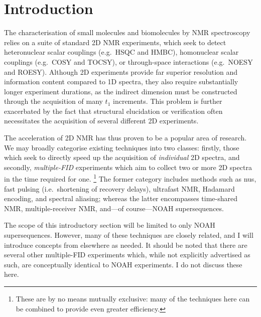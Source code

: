 \section{Introduction}
\label{sec:noah__introduction}

The characterisation of small molecules and biomolecules by NMR spectroscopy relies on a suite of standard 2D NMR experiments, which seek to detect heteronuclear scalar couplings (e.g.\ HSQC and HMBC), homonuclear scalar couplings (e.g.\ COSY and TOCSY), or through-space interactions (e.g.\ NOESY and ROESY).
Although 2D experiments provide far superior resolution and information content compared to 1D spectra, they also require substantially longer experiment durations, as the indirect dimension must be constructed through the acquisition of many $t_1$ increments.
This problem is further exacerbated by the fact that structural elucidation or verification often necessitates the acquisition of several different 2D experiments.

The acceleration of 2D NMR has thus proven to be a popular area of research.
We may broadly categorise existing techniques into two classes: firstly, those which seek to directly speed up the acquisition of \textit{individual} 2D spectra, and secondly, \textit{multiple-FID} experiments which aim to collect two or more 2D spectra in the time required for one.%
\footnote{These are by no means mutually exclusive: many of the techniques here can be combined to provide even greater efficiency.}
The former category includes methods such as 
\acf{nus}\autocite{Barna1987JMR,Kazimierczuk2010PNMRS,Mobli2014PNMRS,Kazimierczuk2015MRC},
fast pulsing (i.e.\ shortening of recovery delays)\autocite{SchulzeSunninghausen2014JACS,Schanda2006JACS,Kupce2007MRC,Schanda2009PNMRS},
ultrafast NMR\autocite{Frydman2002PNASUSA,Pelupessy2003JACS,Frydman2003JACS,Tal2010PNMRS,Gouilleux2018ARNMRS,Kupce2021NRMP},
Hadamard encoding\autocite{Kupce2003JMR,Kupce2003PNMRS},
and spectral aliasing\autocite{Jeannerat2000MRC,Bermel2009JACS,Njock2010C,Jeannerat2011eMR};
whereas the latter encompasses 
time-shared NMR\autocite{Nolis2007ACIE,Parella2010CMR},
multiple-receiver NMR\autocite{Kupce2006JACS,Kupce2008JACS,Kovacs2016MRC},
and---of course---NOAH supersequences\autocite{Kupce2017ACIE,Kupce2021PNMRS,Kupce2021NRMP}.

The scope of this introductory section will be limited to only NOAH supersequences.
However, many of these techniques are closely related, and I will introduce concepts from elsewhere as needed.
It should be noted that there are several other multiple-FID experiments which, while not explicitly advertised as such, are conceptually identical to NOAH experiments.\autocite{Nagy2019CC,Nagy2020JMR,Nagy2021ACIE,Timari2022CC}
I do not discuss these here.




